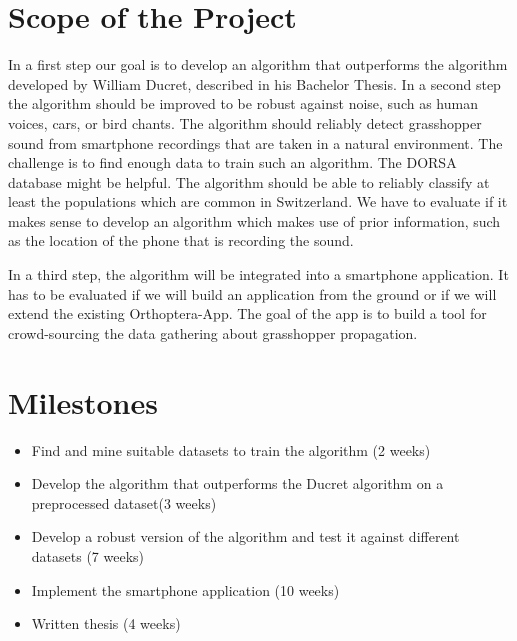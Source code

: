\documentclass[paper=a4, fontsize=11pt]{scrartcl}
\begin{document}
\section*{Scope of the Project}

In a first step our goal is to develop an algorithm that outperforms the algorithm developed by William Ducret, described in his Bachelor Thesis\cite{2015-ducret}. In a second step the algorithm should be improved to be robust against noise, such as human voices, cars, or bird chants. The algorithm should reliably detect grasshopper sound from smartphone recordings that are taken in a natural environment. The challenge is to find enough data to train such an algorithm. The DORSA database\cite{DORSA} might be helpful. The algorithm should be able to reliably classify at least the populations which are common in Switzerland. We have to evaluate if it makes sense to develop an algorithm which makes use of prior information, such as the location of the phone that is recording the sound.

In a third step, the algorithm will be integrated into a smartphone application. It has to be evaluated if we will build an application from the ground or if we will extend the existing Orthoptera-App\cite{orthoapp}. The goal of the app is to build a tool for crowd-sourcing the data gathering about grasshopper propagation. 

\section*{Milestones}

\begin{itemize}
	\item Find and mine suitable datasets to train the algorithm (2 weeks)
  	\item Develop the algorithm that outperforms the Ducret algorithm on a preprocessed dataset(3 weeks)
	\item Develop a robust version of the algorithm and test it against different datasets (7 weeks)
  	\item Implement the smartphone application (10 weeks)
  	\item Written thesis (4 weeks)
\end{itemize}

\vspace{-4mm}
{
\fontsize{10.5pt}{8pt}
\selectfont


}
\end{document}
